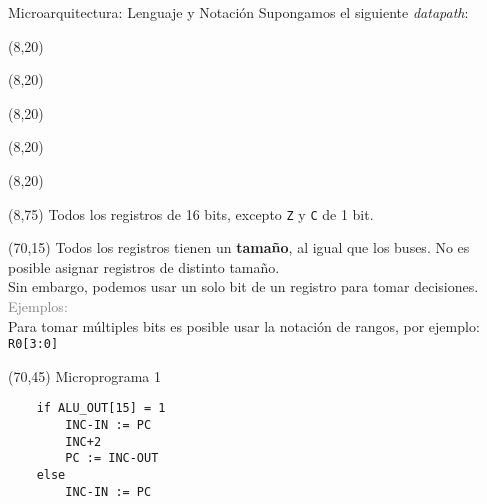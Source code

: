 \documentclass[aspectratio=169]{beamer}
\begin{document}
\begin{frame}[fragile,t]{Microarquitectura: Lenguaje y Notación}
    Supongamos el siguiente \emph{datapath}:
    \begin{textblock}{70}(8,20)  \end{textblock}
    \begin{textblock}{70}(8,20)  \end{textblock}
    \begin{textblock}{70}(8,20)  \end{textblock}
    \begin{textblock}{70}(8,20)  \end{textblock}
    \begin{textblock}{70}(8,20)  \end{textblock}
    \begin{textblock}{70}(8,75) \scriptsize Todos los registros de 16 bits, excepto \texttt{Z} y \texttt{C} de 1 bit. \end{textblock}
    \begin{textblock}{76}(70,15)
    \small
    Todos los registros tienen un \textbf{tamaño}, al igual que los buses. No es posible asignar registros de distinto tamaño.\\
    \vspace{0.2cm}
    Sin embargo, podemos usar un solo bit de un registro para tomar decisiones.\\
    \vspace{0.2cm}
    \textcolor{gray}{Ejemplos:}\\
    \vspace{3.5cm}
    Para tomar múltiples bits es posible usar la notación de rangos, por ejemplo: \texttt{R0[3:0]}
    \end{textblock}
    \begin{textblock}{76}(70,45)
    \scriptsize
    \textcolor{verdeuca}{Microprograma 1}\\
    \vspace{-0.3cm}
    \begin{verbatim}
    if ALU_OUT[15] = 1
        INC-IN := PC
        INC+2
        PC := INC-OUT
    else
        INC-IN := PC

\end{verbatim}
\end{textblock}
\end{frame}
\end{document}
